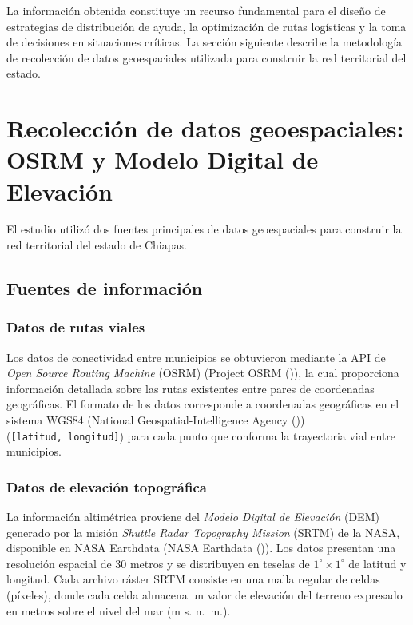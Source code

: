 \documentclass[
  spanish,
  us-letterpaper,
]{scrreprt}
\numberwithin{equation}{section}
\begin{document}
La información obtenida constituye un recurso fundamental para el diseño
de estrategias de distribución de ayuda, la optimización de rutas
logísticas y la toma de decisiones en situaciones críticas. La sección
siguiente describe la metodología de recolección de datos geoespaciales
utilizada para construir la red territorial del estado.

\section{Recolección de datos geoespaciales: OSRM y Modelo Digital de
Elevación}\label{recolecciuxf3n-de-datos-geoespaciales-osrm-y-modelo-digital-de-elevaciuxf3n}

El estudio utilizó dos fuentes principales de datos geoespaciales para
construir la red territorial del estado de Chiapas.

\subsection{Fuentes de información}\label{fuentes-de-informaciuxf3n}

\subsubsection{Datos de rutas viales}\label{datos-de-rutas-viales}

Los datos de conectividad entre municipios se obtuvieron mediante la API
de \emph{Open Source Routing Machine} (OSRM) (Project OSRM
()), la cual proporciona información detallada
sobre las rutas existentes entre pares de coordenadas geográficas. El
formato de los datos corresponde a coordenadas geográficas en el sistema
WGS84 (National Geospatial-Intelligence Agency
()) (\texttt{{[}latitud,\ longitud{]}})
para cada punto que conforma la trayectoria vial entre municipios.

\subsubsection{Datos de elevación
topográfica}\label{datos-de-elevaciuxf3n-topogruxe1fica}

La información altimétrica proviene del \emph{Modelo Digital de
Elevación} (DEM) generado por la misión \emph{Shuttle Radar Topography
Mission} (SRTM) de la NASA, disponible en NASA Earthdata (NASA Earthdata
()). Los datos presentan una
resolución espacial de 30 metros y se distribuyen en teselas de
\(1^\circ \times 1^\circ\) de latitud y longitud. Cada archivo ráster
SRTM consiste en una malla regular de celdas (píxeles), donde cada celda
almacena un valor de elevación del terreno expresado en metros sobre el
nivel del mar (m s. n.~m.).
\end{document}
